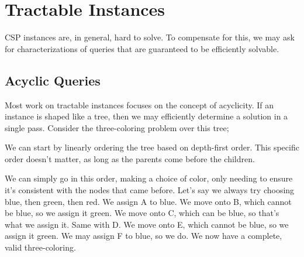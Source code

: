 \section{Tractable Instances}\label{sec:tractable-queries}
CSP instances are, in general, hard to solve. To compensate for this, we may ask for characterizations of queries that are guaranteed to be efficiently solvable.

\subsection{Acyclic Queries}\label{sec:acyclic-queries}

Most work on tractable instances focuses on the concept of acyclicity. If an instance is shaped like a tree, then we may efficiently determine a solution in a single pass. Consider the three-coloring problem over this tree;

\begin{center}
\end{center}

We can start by linearly ordering the tree based on depth-first order. This specific order doesn't matter, as long as the parents come before the children.

\begin{center}
\end{center}

We can simply go in this order, making a choice of color, only needing to ensure it's consistent with the nodes that came before. Let's say we always try choosing blue, then green, then red. We assign A to blue. We move onto B, which cannot be blue, so we assign it green. We move onto C, which can be blue, so that's what we assign it. Same with D. We move onto E, which cannot be blue, so we assign it green. We may assign F to blue, so we do. We now have a complete, valid three-coloring.

